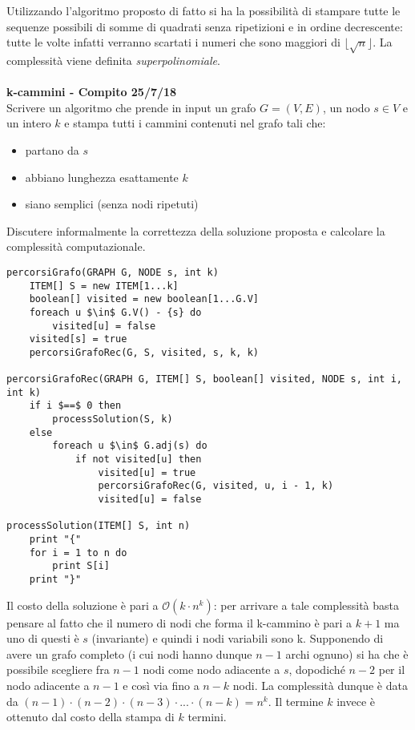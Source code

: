 \documentclass[../cheatSheetAlgoritmi.tex]{subfiles}
\begin{document}
Utilizzando l'algoritmo proposto di fatto si ha la possibilità di stampare tutte le sequenze possibili di somme di quadrati senza ripetizioni e in ordine decrescente: tutte le volte infatti verranno scartati i numeri che sono maggiori di $\lfloor \sqrt n \rfloor$. La complessità viene definita \emph{superpolinomiale}.\\\\
\textbf{k-cammini - Compito 25/7/18}\\
Scrivere un algoritmo che prende in input un grafo $G= (V, E)$, un nodo $s \in V$ e un intero $k$ e stampa tutti i cammini contenuti nel grafo tali che:
\begin{itemize}
	\item partano da $s$
	\item abbiano lunghezza esattamente $k$
	\item siano semplici (senza nodi ripetuti)
\end{itemize}
Discutere informalmente la correttezza della soluzione proposta e calcolare la complessità computazionale.
\begin{lstlisting}[caption=Percorsi grafo]
percorsiGrafo(GRAPH G, NODE s, int k)
    ITEM[] S = new ITEM[1...k]
    boolean[] visited = new boolean[1...G.V]
    foreach u $\in$ G.V() - {s} do
        visited[u] = false
    visited[s] = true
    percorsiGrafoRec(G, S, visited, s, k, k)

percorsiGrafoRec(GRAPH G, ITEM[] S, boolean[] visited, NODE s, int i, int k)
    if i $==$ 0 then
        processSolution(S, k)
    else
        foreach u $\in$ G.adj(s) do
            if not visited[u] then
	            visited[u] = true
	            percorsiGrafoRec(G, visited, u, i - 1, k)
	            visited[u] = false
            
processSolution(ITEM[] S, int n)
    print "{"
    for i = 1 to n do
        print S[i]
    print "}"
\end{lstlisting}
Il costo della soluzione è pari a $\mathcal{O}(k \cdot n^{k})$: per arrivare a tale complessità basta pensare al fatto che il numero di nodi che forma il k-cammino è pari a $k+1$ ma uno di questi è $s$ (invariante) e quindi i nodi variabili sono k. Supponendo di avere un grafo completo (i cui nodi hanno dunque $n-1$ archi ognuno) si ha che è possibile scegliere fra $n-1$ nodi come nodo adiacente a $s$, dopodiché $n-2$ per il nodo adiacente a $n-1$ e così via fino a $n-k$ nodi. La complessità dunque è data da $(n-1) \cdot (n-2) \cdot (n-3) \cdot ... \cdot (n-k) = n^{k}$. Il termine $k$ invece è ottenuto dal costo della stampa di $k$ termini.
\newpage
\end{document}
